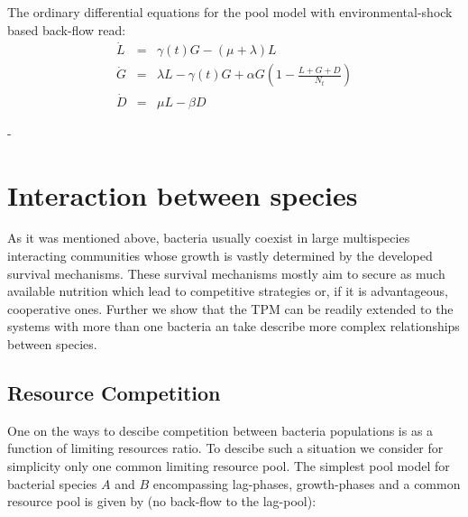 \documentclass[10pt,A4paper]{article}
\begin{document}
The ordinary differential equations for the pool model with environmental-shock based back-flow read:
\begin{eqnarray}
\dot{L} &=&\gamma(t) G - (\mu + \lambda) L\\
\dot{G} &=& \lambda L -\gamma(t) G + \alpha G\left(1-\frac{L+G+D}{N_t}\right)\\
\dot{D} &=& \mu  L - \beta D
\end{eqnarray}

-  


\newpage

\section{Interaction between species}

As it was mentioned above, bacteria usually coexist in large multispecies interacting communities whose growth is vastly determined by the developed survival mechanisms.
These survival mechanisms mostly aim to secure as much available nutrition which lead to competitive strategies or, if it is advantageous, cooperative ones.
Further we show that the TPM can be readily extended to the systems with more than one bacteria an take describe more complex relationships between species. 

\subsection{Resource Competition}

One on the ways to descibe competition between bacteria populations is as a function of limiting resources ratio. 
To descibe such a situation we consider for simplicity only one common limiting resource pool. 
The simplest pool model for bacterial species $A$ and $B$ encompassing lag-phases, growth-phases and a common resource pool is given by (no back-flow to the lag-pool):
\end{document}
